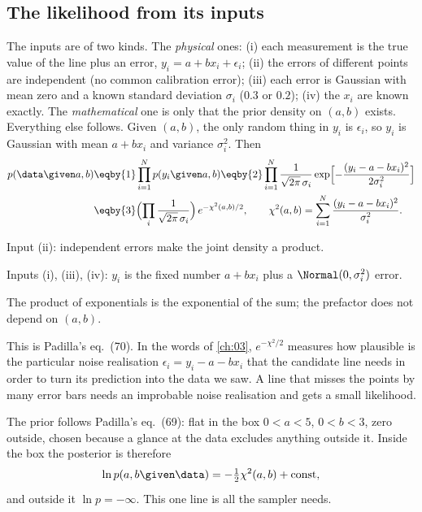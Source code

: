 \subsection{The likelihood from its inputs}
\label{9c:sec:line-like}

The inputs are of two kinds. The \emph{physical} ones: (i) each measurement is the true value of
the line plus an error, $y_i=a+bx_i+\epsilon_i$; (ii) the errors of different points are
independent (no common calibration error); (iii) each error is Gaussian with mean zero and a
known standard deviation $\sigma_i$ ($0.3$ or $0.2$); (iv) the $x_i$ are known exactly. The
\emph{mathematical} one is only that the prior density on $(a,b)$ exists. Everything else follows.
Given $(a,b)$, the only random thing in $y_i$ is $\epsilon_i$, so $y_i$ is Gaussian with mean
$a+bx_i$ and variance $\sigma_i^2$. Then
\begin{align}
  p(\data\given a,b)
  &\eqby{1}\prod_{i=1}^{N}p(y_i\given a,b)
   \eqby{2}\prod_{i=1}^{N}\frac{1}{\sqrt{2\pi}\,\sigma_i}
     \exp\Bigl[-\frac{(y_i-a-bx_i)^2}{2\sigma_i^2}\Bigr]
   \nonumber\\
  &\eqby{3}\Bigl(\prod_i\frac1{\sqrt{2\pi}\,\sigma_i}\Bigr)\,
     e^{-\chi^2(a,b)/2},
  \qquad
  \chi^2(a,b)=\sum_{i=1}^{N}\frac{(y_i-a-bx_i)^2}{\sigma_i^2}.
  \label{9c:eq:line-like}
\end{align}
\begin{explain}
  \item Input (ii): independent errors make the joint density a product.
  \item Inputs (i), (iii), (iv): $y_i$ is the fixed number $a+bx_i$ plus a $\Normal(0,\sigma_i^2)$ error.
  \item The product of exponentials is the exponential of the sum; the prefactor does not depend
        on $(a,b)$.
\end{explain}
This is Padilla's eq.~(70). In the words of \cref{ch:03}, $e^{-\chi^2/2}$ measures how plausible is
the particular noise realisation $\epsilon_i=y_i-a-bx_i$ that the candidate line needs in order to
turn its prediction into the data we saw. A line that misses the points by many error bars needs
an improbable noise realisation and gets a small likelihood.

The prior follows Padilla's eq.~(69): flat in the box $0<a<5$, $0<b<3$, zero outside, chosen
because a glance at the data excludes anything outside it. Inside the box the posterior is
therefore
\begin{equation}
  \ln p(a,b\given\data)=-\tfrac12\chi^2(a,b)+\text{const},
  \label{9c:eq:line-logpost}
\end{equation}
and outside it $\ln p=-\infty$. This one line is all the sampler needs.

